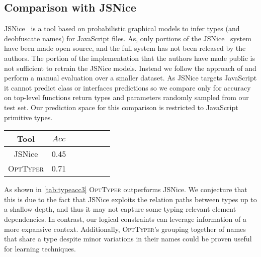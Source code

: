 \documentclass[acmsmall, review, anonymous]{acmart}\settopmatter{printfolios=true,printccs=false,printacmref=false}
\newcommand{\projectname}{\textsc{OptTyper}\xspace}
\begin{document}
\subsection{Comparison with JSNice}
JSNice~\citet{raychev15} is a tool based on probabilistic graphical models to infer types (and deobfuscate names) for JavaScript files. As, only portions of the JSNice~\cite{raychev15} system have been made open source, and the full system has not been released by the authors. The portion of the implementation that the authors have made public is not sufficient to retrain the JSNice models. 
Instead we follow the approach of \citep{wei20} and perform a manual
evaluation over a smaller dataset. As JSNice targets JavaScript it cannot predict class or interfaces predictions so we compare only for accuracy on top-level functions return types and parameters randomly sampled from our test set. Our prediction
space for this comparison is restricted to
JavaScript primitive types.

\begin{table*}[t]
	\centering
	\caption{Accuracy for JSNice and OptTyper; on 107 annotations slots.}
		\label{tab:typeacc3}
	\begin{tabular}{ccccccc}
		\toprule
		Tool   & $Acc$ \\
		\midrule
		JSNice     & 0.45\\
		\projectname & 0.71\\
		\bottomrule
	\end{tabular}
\end{table*}
As shown in \cref{tab:typeacc3} \projectname outperforms JSNice. We conjecture that this is due
to the fact that JSNice exploits the relation paths between types up to a shallow depth, and thus it may not
capture some typing relevant element dependencies. 
In contrast, our logical constraints can leverage
information of a more expansive context. Additionally,
\projectname's grouping together of names that share a type despite minor variations in their names could
be proven useful for learning techniques.


\end{document}
